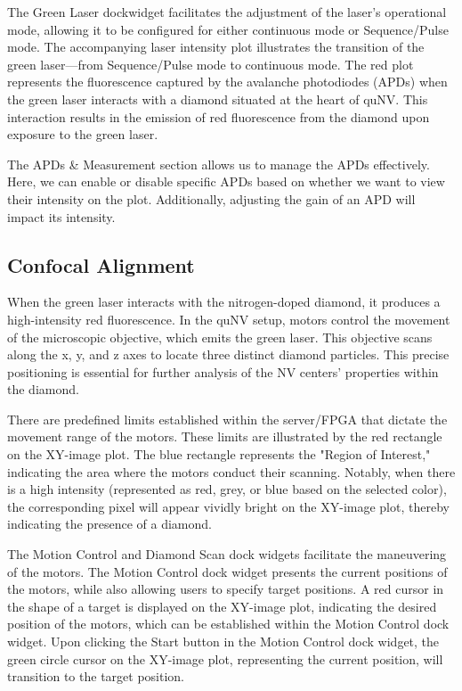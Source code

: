 The Green Laser dockwidget facilitates the adjustment of the laser's operational mode, allowing it to be configured for either continuous mode or Sequence/Pulse mode. The accompanying laser intensity plot illustrates the transition of the green laser—from Sequence/Pulse mode to continuous mode. The red plot represents the fluorescence captured by the avalanche photodiodes (APDs) when the green laser interacts with a diamond situated at the heart of \acs{quNV}. This interaction results in the emission of red fluorescence from the diamond upon exposure to the green laser.

The \acs{APD}s \& Measurement section allows us to manage the \acs{APD}s effectively. Here, we can enable or disable specific \acs{APD}s based on whether we want to view their intensity on the plot. Additionally, adjusting the gain of an \acs{APD} will impact its intensity.

\subsection{Confocal Alignment}

When the green laser interacts with the nitrogen-doped diamond, it produces a high-intensity red fluorescence. In the \acs{quNV} setup, motors control the movement of the microscopic objective, which emits the green laser. This objective scans along the x, y, and z axes to locate three distinct diamond particles. This precise positioning is essential for further analysis of the \acs{NV} centers' properties within the diamond.

There are predefined limits established within the server/\acs{FPGA} that dictate the movement range of the motors. These limits are illustrated by the red rectangle on the XY-image plot. The blue rectangle represents the "Region of Interest," indicating the area where the motors conduct their scanning. Notably, when there is a high intensity (represented as red, grey, or blue based on the selected color), the corresponding pixel will appear vividly bright on the XY-image plot, thereby indicating the presence of a diamond.

The Motion Control and Diamond Scan dock widgets facilitate the maneuvering of the motors. The Motion Control dock widget presents the current positions of the motors, while also allowing users to specify target positions. A red cursor in the shape of a target is displayed on the XY-image plot, indicating the desired position of the motors, which can be established within the Motion Control dock widget. Upon clicking the Start button in the Motion Control dock widget, the green circle cursor on the XY-image plot, representing the current position, will transition to the target position.

